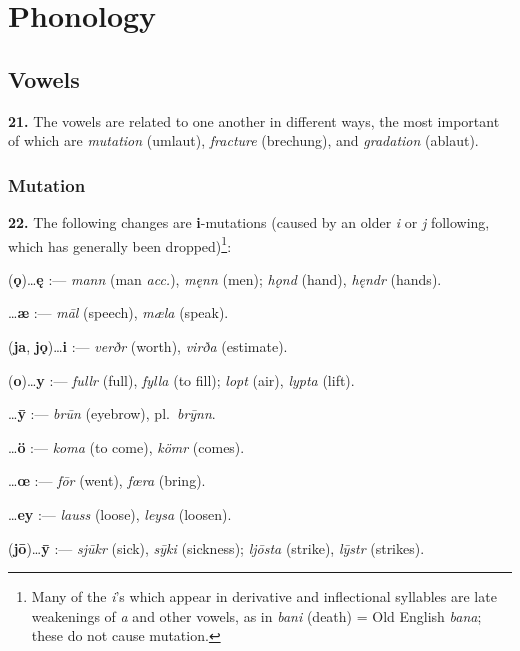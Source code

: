 \documentclass[12pt,letterpaper]{book}
\newcommand{\gap}[1][.25in]{\hspace{#1}}
\newcommand\emptypage{\clearpage{\pagestyle{empty}\cleardoublepage}}
\begin{document}
\emptypage

\chapter{Phonology}

\section{Vowels}

\textbf{21.} The vowels are related to one another in different ways, the
most important of which are \textit{mutation} (umlaut), \textit{fracture}
(brechung), and \textit{gradation} (ablaut).

\subsection{Mutation}

\textbf{22.} The following changes are {\bf i}-mutations (caused by an older
\textit{i} or \textit{j} following, which has generally been
dropped)\footnote{Many of the \textit{i}'s which appear in derivative and
inflectional syllables are late weakenings of \textit{a} and other
vowels, as in \textit{bani} (death) = Old English \textit{bana}; these
do not cause mutation.}:

\gap{\bf a} ({\bf ǫ})\ldots  {\bf ę} :--- \textit{mann} (man \textit{acc.}),
\textit{męnn} (men); \textit{hǫnd} (hand), \textit{hęndr} (hands).

\gap{\bf ā}\ldots {\bf æ} :--- \textit{māl} (speech), \textit{mæla} (speak).

\gap{\bf e} ({\bf ja}, {\bf jǫ})\ldots {\bf i} :--- \textit{verðr}
(worth), \textit{virða} (estimate).

\gap{\bf u} ({\bf o})\ldots {\bf y} :--- \textit{fullr} (full), \textit{fylla}
(to fill); \textit{lopt} (air), \textit{lypta} (lift).

\gap{\bf ū}\ldots {\bf ȳ} :--- \textit{brūn} (eyebrow), pl.\ \textit{brȳnn}.

\gap{\bf o}\ldots {\bf ö} :--- \textit{koma} (to come), \textit{kömr} (comes).

\gap{\bf ō}\ldots {\bf œ} :--- \textit{fōr} (went), \textit{fœra} (bring).

\gap{\bf au}\ldots {\bf ey} :--- \textit{lauss} (loose), \textit{leysa}
(loosen).

\gap{\bf jū} ({\bf jō})\ldots {\bf ȳ} :--- \textit{sjūkr} (sick), \textit{sȳki}
(sickness); \textit{ljōsta} (strike), \textit{lȳstr} (strikes).
\end{document}
